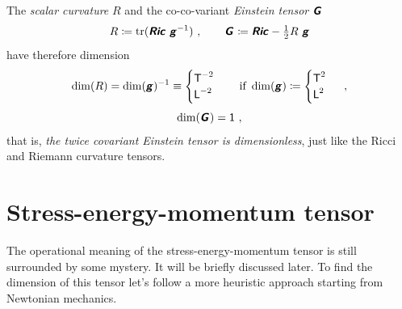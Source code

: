 \documentclass[\ifafour a4paper,12pt,\else a5paper,10pt,\fi%
onecolumn,oneside,article,%
british%
]{memoir}
\makeatletter
\theoremstyle{remark}
\theoremstyle{innote}
\newcommand*{\mathte}[1]{\textbf{\textit{\textsf{#1}}}}
\DeclareMathOperator{\tr}{tr}%
\newcommand*{\defd}{\coloneqq}
\renewcommand*{\|}[1][]{\nonscript\,#1\vert\nonscript\;\mathopen{}}
\newcommand*{\q}{}%
\DeclareRobustCommand*{\q}{%
  \mathbin{\mathpalette\bigcdot@{}}%
}
\newcommand*{\bigcdot@scalefactor}{0.7}
\newcommand*{\bigcdot@widthfactor}{1.5}
\newcommand*{\bigcdot@}[2]{%
  \sbox0{$#1\vcenter{}$}%
  \sbox2{$#1\cdot\m@th$}%
  \hbox to \bigcdot@widthfactor\wd2{%
    \hfil
    \raise\ht0\hbox{%
      \scalebox{\bigcdot@scalefactor}{%
        \lower\ht0\hbox{$#1\bullet\m@th$}%
      }%
    }%
    \hfil
  }%
}
\newcommand*{\Un}{\textsf{1}}
\newcommand*{\Le}{\textsf{L}}
\newcommand*{\Ti}{\textsf{T}}
\newcommand*{\yg}{\mathte{g}}
\newcommand*{\yG}{\mathte{G}}
\newcommand*{\yRi}{\mathte{Ric}}
\newcommand*{\ysc}{R}
\renewcommand*{\i}{\indices}
\makeatother
\begin{document}
The \emph{scalar curvature} $\ysc$ and the co-co-variant \emph{Einstein
  tensor} $\yG\i{_{\q\q}}$
\begin{equation}
  \label{eq:curv_einst}
  \ysc \defd %
  \tr(\yRi\ \yg^{-1})
  \ ,
  \qquad
  \yG\i{_{\q\q}} \defd \yRi -%
  \tfrac{1}{2} \ysc\ \yg %
\end{equation}
have therefore dimension
\begin{gather}
  \label{eq:dim_scalcurv}
  \dim(\ysc) = \dim(\yg)^{-1} \equiv
  \begin{cases}
    \Ti^{-2} \\
    \Le^{-2}
  \end{cases}
  \quad\text{if }\dim(\yg)\defd
  \begin{cases}
     \Ti^2 \\
    \Le^2
  \end{cases}\ ,
  \\[\jot]
  \label{eq:dim_einst}
  \dim(\yG\i{_{\q\q}}) = \Un \ ,
\end{gather}
that is, \emph{the twice covariant Einstein tensor is dimensionless}, just
like the Ricci and Riemann curvature tensors.

\section{Stress-energy-momentum tensor}
\label{sec:stressenergy}

The operational meaning of the stress-energy-momentum tensor is still
surrounded by some mystery. It will be briefly discussed later. To find the
dimension of this tensor let's follow a more heuristic approach starting
from Newtonian mechanics.
\end{document}
